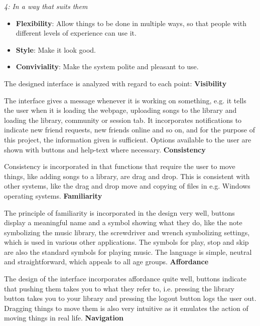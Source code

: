 	\textit{4: In a way that suits them}
	
\begin{itemize}
	\item{\textbf{Flexibility}}: Allow things to be done in multiple ways, so that people with different levels of experience can use it.
	\item{\textbf{Style}}: Make it look good.
	\item{\textbf{Conviviality}}: Make the system polite and pleasant to use.
\end{itemize}\cite{Benyon10}

The designed interface is analyzed with regard to each point:
\vspace{10pt}
\textbf{Visibility}

\vspace{10pt}The interface gives a message whenever it is working on something, e.g. it tells the user when it is loading the webpage,
uploading songs to the library and loading the library, community or session tab. It incorporates notifications
to indicate new friend requests, new friends online and so on, and for the purpose of this project, the information given
is sufficient. Options available to the user are shown with buttons and help-text where necessary.
\vspace{10pt}
\textbf{Consistency}

\vspace{10pt}Consistency is incorporated in that functions that require the user to move things, like adding songs to a library, are drag
and drop. This is consistent with other systems, like the drag and drop move and copying of files in e.g. Windows operating
systems.
\vspace{10pt}
\textbf{Familiarity}

\vspace{10pt}The principle of familiarity is incorporated in the design very well, buttons display a meaningful name and a symbol showing
what they do, like the note symbolizing the music library, the screwdriver and wrench symbolizing settings, which is used in
various other applications. The symbols for play, stop and skip are also the standard symbols for playing music. The language is
simple, neutral and straightforward, which appeals to all age groups.
\vspace{10pt}
\textbf{Affordance}

\vspace{10pt}The design of the interface incorporates affordance quite well, buttons indicate that pushing them takes you to what they
refer to, i.e. pressing the library button takes you to your library and pressing the logout button logs the user out.
Dragging things to move them is also very intuitive as it emulates the action of moving things in real life.
\vspace{10pt}
\textbf{Navigation}

